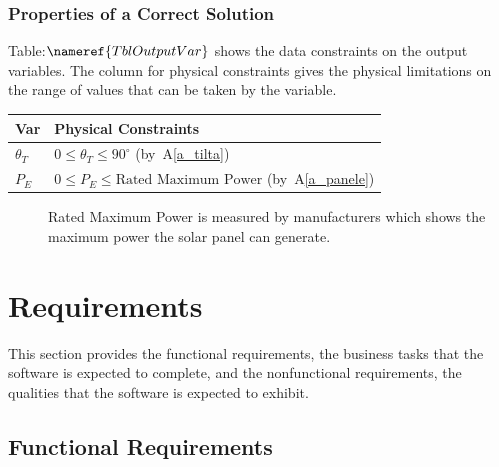 \documentclass[12pt]{article}
\newcommand{\aref}[1]{A\ref{#1}}
\begin{document}
\subsubsection{Properties of a Correct Solution} \label{sec_CorrectSolution}

\noindent
Table:$\nameref{TblOutputVar}$ shows the data constraints on the output variables. The column
for physical constraints gives the physical limitations on the range of values that can be
taken by the variable.

\begin{table}[!h]
\caption{Output Variables} \label{TblOutputVar}
\renewcommand{\arraystretch}{1.2}
\noindent \begin{longtable*}{l l} 
  \toprule
  \textbf{Var} & \textbf{Physical Constraints} \\
  \midrule 
  $\theta_{T}$ & $0 \leq \theta_{T} \leq 90^\circ$ (by~\aref{a_tilta})\\
  $P_E$ & $0 \leq P_E \leq \text{Rated Maximum Power}$ (by~\aref{a_panele})
  \\
  \bottomrule
\end{longtable*}
\end{table}

\begin{description}

\item[ ] Rated Maximum Power is measured by manufacturers which shows the 
maximum power the solar panel can generate.

\end{description}

\section{Requirements}

This section provides the functional requirements, the business tasks that the
software is expected to complete, and the nonfunctional requirements, the
qualities that the software is expected to exhibit.



\subsection{Functional Requirements}
\end{document}

